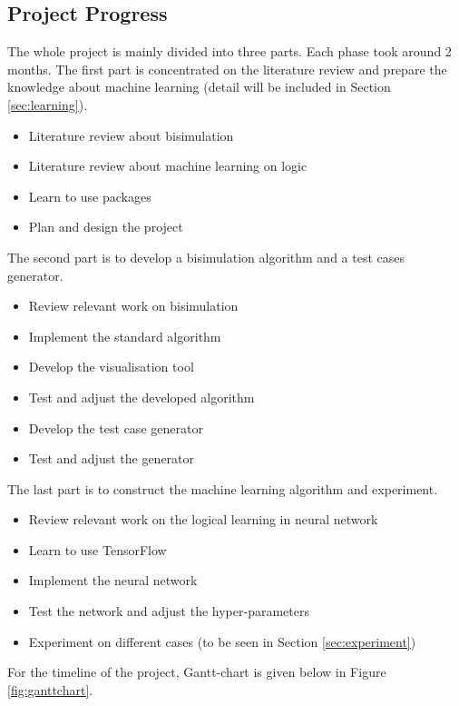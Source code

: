 \subsection{Project Progress}
The whole project is mainly divided into three parts.
Each phase took around 2 months.
The first part is concentrated on the literature review and prepare the knowledge about machine learning (detail will be included in Section \ref{sec:learning}).
\begin{itemize}
    \item Literature review about bisimulation
    \item Literature review about machine learning on logic
    \item Learn to use packages
    \item Plan and design the project
\end{itemize}
The second part is to develop a bisimulation algorithm and a test cases generator.
\begin{itemize}
    \item Review relevant work on bisimulation
    \item Implement the standard algorithm
    \item Develop the visualisation tool
    \item Test and adjust the developed algorithm
    \item Develop the test case generator 
    \item Test and adjust the generator 
\end{itemize}
The last part is to construct the machine learning algorithm and experiment.
\begin{itemize}
    \item Review relevant work on the logical learning in neural network 
    \item Learn to use TensorFlow 
    \item Implement the neural network 
    \item Test the network and adjust the hyper-parameters
    \item Experiment on different cases (to be seen in Section \ref{sec:experiment})
\end{itemize}
For the timeline of the project, Gantt-chart is given below in Figure \ref{fig:ganttchart}.

